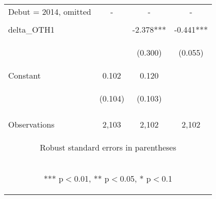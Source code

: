 \begin{center}
\begin{tabular}{lccc}
Debut = 2014, omitted & - & - & - \\
\vspace{4pt} & \begin{footnotesize}\end{footnotesize} & \begin{footnotesize}\end{footnotesize} & \begin{footnotesize}\end{footnotesize} \\
delta\_OTH1 &  & -2.378*** & -0.441*** \\
\vspace{4pt} & \begin{footnotesize}\end{footnotesize} & \begin{footnotesize}(0.300)\end{footnotesize} & \begin{footnotesize}(0.055)\end{footnotesize} \\
Constant & 0.102 & 0.120 &  \\
 & \begin{footnotesize}(0.104)\end{footnotesize} & \begin{footnotesize}(0.103)\end{footnotesize} & \begin{footnotesize}\end{footnotesize} \\
\vspace{4pt} & \begin{footnotesize}\end{footnotesize} & \begin{footnotesize}\end{footnotesize} & \begin{footnotesize}\end{footnotesize} \\
 Observations & 2,103 & 2,102 & 2,102 \\ \hline
\multicolumn{4}{c}{\begin{footnotesize} Robust standard errors in parentheses\end{footnotesize}} \\
\multicolumn{4}{c}{\begin{footnotesize} *** p$<$0.01, ** p$<$0.05, * p$<$0.1\end{footnotesize}} \\
\end{tabular}
\end{center}
